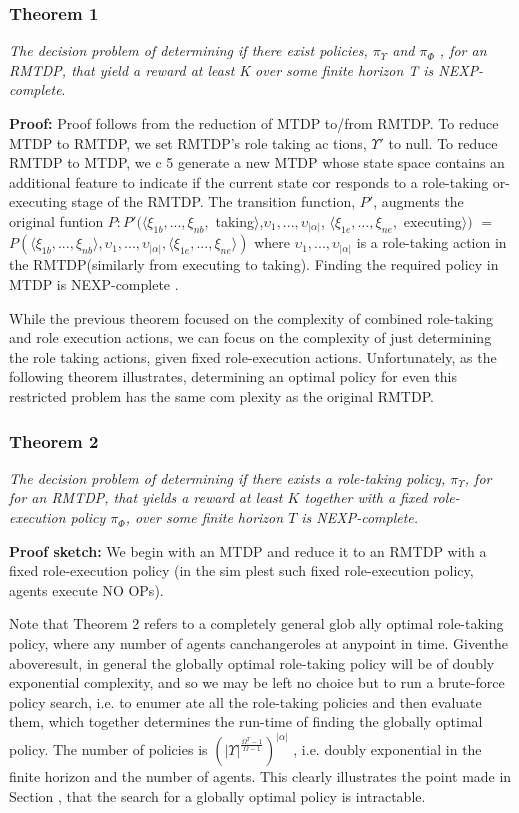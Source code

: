 \documentclass{IEEEtran}
\begin{document}
\subsubsection{Theorem 1} {\itshape{The decision problem of determining if there
 exist policies, $\pi_\Upsilon$ and $\pi_\Phi$ , for an RMTDP, that yield a reward at least K over some finite horizon T is NEXP-complete}}.
 

\textbf{Proof:} Proof follows from the reduction of MTDP \cite{Pynadath} to/from RMTDP. To reduce
 MTDP to RMTDP, we set RMTDP's role taking ac
tions, $\Upsilon'$  to null. To reduce RMTDP to MTDP, we
 c 5
 generate a new MTDP whose state space contains an
 additional feature to indicate if the current state cor
responds to a role-taking or-executing stage of the
 RMTDP. The transition function, $P'$, augments the original funtion $P:P'(\langle\xi_{1b},...,\xi_{nb},$ taking$\rangle$,$\upsilon_1,...,\upsilon_{|\alpha|}$, $\langle\xi_{1e},...,\xi_{ne},$ executing$\rangle)$ $=$ $P(\langle\xi_{1b},...,\xi_{nb}\rangle,\upsilon_1,...,\upsilon_{|\alpha|},\langle\xi_{1e},...,\xi_{ne}\rangle)$ where $\upsilon_1,...,\upsilon_{|\alpha|}$ is a role-taking action in the RMTDP(similarly from executing to taking). Finding the
 required policy in MTDP is NEXP-complete \cite{Pynadath}.

  While the previous theorem focused on the complexity
 of combined role-taking and role execution actions, we can
 focus on the complexity of just determining the role taking
 actions, given fixed role-execution actions. Unfortunately,
 as the following theorem illustrates, determining an optimal
 policy for even this restricted problem has the same com
plexity as the original RMTDP.

\subsubsection{Theorem 2} {\itshape{The decision problem of determining if there
 exists a role-taking policy, $\pi_\Upsilon$, for  for an RMTDP, that yields
 a reward at least $K$ together with a fixed role-execution policy $\pi_\Phi$,  over some finite horizon $T$ is NEXP-complete.}}

\textbf{Proof sketch:} We begin with an MTDP and reduce it to
 an RMTDP with a fixed role-execution policy (in the sim
plest such fixed role-execution policy, agents execute NO
OPs).

Note that Theorem 2 refers to a completely general glob
ally optimal role-taking policy, where any number of agents
 canchangeroles at anypoint in time. Giventhe aboveresult,
 in general the globally optimal role-taking policy will be of doubly exponential complexity, and so we may be left no
 choice but to run a brute-force policy search, i.e. to enumer
ate all the role-taking policies and then evaluate them, which
 together determines the run-time of finding the globally optimal  policy. The number of policies is $({|\Upsilon|}^\frac{\Omega^T-1}{\Omega-1})^{|\alpha|}$ , i.e. doubly exponential in the finite horizon and the number of
 agents. This clearly illustrates the point made in Section ,
 that the search for a globally optimal policy is intractable.
\end{document}
